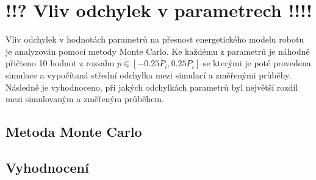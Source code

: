 \chapter{!!? Vliv odchylek v parametrech !!!!}



Vliv odchylek v hodnotách parametrů na přesnost energetického modelu robotu je analyzován pomocí metody Monte Carlo. Ke každému z parametrů je náhodně přičteno 10 hodnot z rozsahu $p \in [-0.25P_i,0.25P_i]$ se kterými je poté provedena simulace a vypočítaná střední odchylka mezi simulací a změřenými průběhy. Následně je vyhodnoceno, při jakých odchylkách parametrů byl největší rozdíl mezi simulovaným a změřeným průběhem.

\section{Metoda Monte Carlo}

\section{Vyhodnocení}